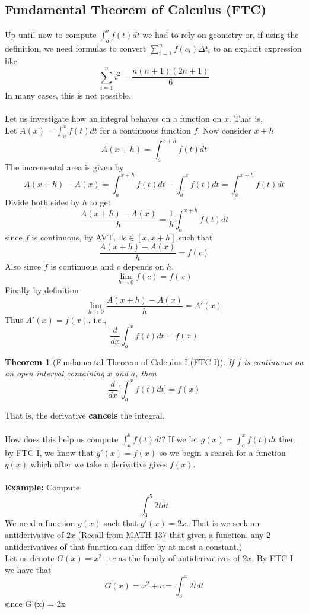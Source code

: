 \documentclass[10pt]{article}
\theoremstyle{break}
\newtheorem{thm}{Theorem}[subsection]
\begin{document}
\subsection{Fundamental Theorem of Calculus (FTC)}
Up until now to compute $\int^b_af(t)dt$ we had to rely on geometry or, if using the definition, we need formulas to convert $\sum^n_{i=1}f(c_i) \Delta t_i$ to an explicit expression like $$\sum^n_{i=1}i^2 = \dfrac{n(n+1)(2n+1)}{6}$$
In many cases, this is not possible. \\ \: \\
Let us investigate how an integral behaves on a function on $x$. That is, \\
Let $A(x) = \int^x_a f(t) dt$ for a continuous function $f$. Now consider $x + h$ $$A(x+h) = \int^{x+h}_{a} f(t) dt$$
The incremental area is given by 
$$A(x+h) - A(x) = \int^{x+h}_{a}f(t) dt - \int^x_a f(t) dt = \int^{x+h}_x f(t) dt$$
Divide both sides by $h$ to get $$\dfrac{A(x+h) - A(x)}{h} = \dfrac{1}{h}\int^{x+h}_{a}f(t) dt$$
since $f$ is continuous, by AVT, $\exists c \in [x, x+h]$ such that $$\dfrac{A(x+h) - A(x)}{h} = f(c)$$
Also since $f$ is continuous and $c$ depends on $h$, $$\lim_{h \to 0} f(c) = f(x)$$
Finally by definition $$\lim_{h \to 0}\dfrac{A(x+h) - A(x)}{h} = A'(x)$$
Thus $A'(x) = f(x)$, i.e., $$\dfrac{d}{dx}\int^x_a f(t) dt = f(x)$$
\begin{thm}[Fundamental Theorem of Calculus I (FTC I)]
  If $f$ is continuous on an open interval containing $x$ and $a$, then $$\dfrac{d}{dx}\bigg[\int^x_a f(t) dt\bigg] = f(x)$$
\end{thm}
That is, the derivative \textbf{cancels} the integral.\\ \; \\
How does this help us compute $\int^b_a f(t) dt$? If we let $g(x) = \int^x_a f(t) dt$ then by FTC I, we know that $g'(x) = f(x)$ so we begin a search for a function $g(x)$
which after we take a derivative gives $f(x)$.
\\ \; \\
\textbf{Example:} Compute $$\int^5_3 2t dt$$
We need a function $g(x)$ such that $g'(x) = 2x$. That is we seek an antiderivative of $2x$ (Recall from MATH 137 that
given a function, any 2 antiderivatives of that function can differ by at most a constant.)\\
Let us denote $G(x) = x^2 + c$ as the family of antiderivatives of $2x$. By FTC I we have that 
$$G(x) = x^2 + c = \int^x_3 2t dt$$ since G'(x) = 2x \\ \: \\
\end{document}
